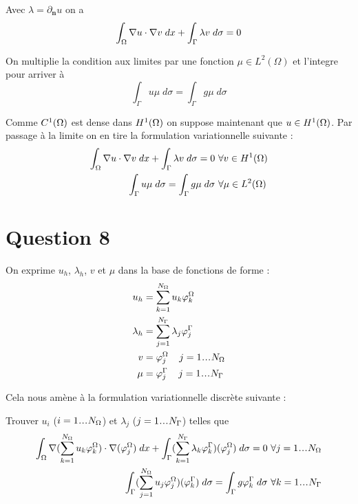 \documentclass[french, 12pt, a4paper]{article}
\begin{document}
Avec $\lambda = \partial_{\bm n}{u}$ on a
\[
\int_\Omega \nabla u \cdot \nabla v \; dx
+ \int_\Gamma \lambda v \; d\sigma = 0
\]

On multiplie la condition aux limites par une fonction $\mu \in L^2(\Omega)$
et l'integre pour arriver à
\[\int_\Gamma u \mu \; d\sigma = \int_\Gamma g \mu \; d\sigma\]

Comme $C^1(\Omega)$ est dense dans $H^1(\Omega)$ on suppose maintenant
que $u \in H^1(\Omega)$. Par passage à la limite on en tire la formulation
variationnelle suivante :
\begin{eqnarray}
\int_\ouvert \nabla u \cdot \nabla v \; dx
+ \int_\Gamma \lambda v \; d\sigma = 0 & \forall v \in H^1(\ouvert) \\
\int_\Gamma u \mu \; d\sigma = \int_\Gamma g \mu \; d\sigma &
\forall \mu \in L^2(\Omega)
\end{eqnarray}


\section*{Question 8}

On exprime $u_h$, $\lambda_h$, $v$ et $\mu$ dans la base de fonctions de forme :
\begin{align}
u_h &= \sum_{k=1}^{N_\Omega} u_k \phi_k^\Omega \\
\lambda_h &= \sum_{j=1}^{N_\Gamma} \lambda_j \phi_j^\Gamma \\
v &= \phi_j^\Omega \;\;\;\; j = 1 \sdots N_\Omega \\
\mu &= \phi_j^\Gamma \;\;\;\; j = 1 \sdots N_\Gamma
\end{align}

Cela nous amène à la formulation variationnelle discrète suivante :

Trouver $u_i$ ($i = 1 \sdots N_\Omega$) et $\lambda_j$ ($j = 1 \sdots N_\Gamma$)
telles que
\begin{eqnarray}
\int_\ouvert \nabla (\sum_{k=1}^{N_\Omega} u_k \phi_k^\Omega)
\cdot \nabla (\phi_j^\Omega) \; dx
%
+ \int_\Gamma (\sum_{k=1}^{N_\Gamma} \lambda_k \phi_k^\Gamma) (\phi_j^\Omega) \;
d\sigma = 0 & \forall j = 1 \sdots N_\Omega \\
%
\int_\Gamma (\sum_{j=1}^{N_\Omega} u_j \phi_j^\Omega) (\phi_k^\Gamma) \; d\sigma
= \int_\Gamma g \phi_k^\Gamma \; d\sigma &
\forall k = 1 \sdots N_\Gamma
\end{eqnarray}
\end{document}
